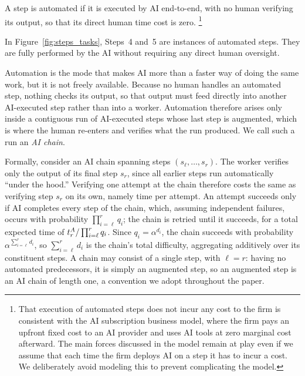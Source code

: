 \begin{definition}
\label{def:automated_task}
A step is automated if it is executed by AI end-to-end, with no human verifying its output, so that its direct human time cost is zero.%
\footnote{That execution of automated steps does not incur any cost to the firm is consistent with the AI subscription business model, where the firm pays an upfront fixed cost to an AI provider and uses AI tools at zero marginal cost afterward. The main forces discussed in the model remain at play even if we assume that each time the firm deploys AI on a step it has to incur a cost. We deliberately avoid modeling this to prevent complicating the model.}
\end{definition}
In Figure~\ref{fig:steps_tasks}, Steps~4 and~5 are instances of automated steps. They are fully performed by the AI without requiring any direct human oversight.

Automation is the mode that makes AI more than a faster way of doing the same work, but it is not freely available.
Because no human handles an automated step, nothing checks its output, so that output must feed directly into another AI-executed step rather than into a worker.
Automation therefore arises only inside a contiguous run of AI-executed steps whose last step is augmented, which is where the human re-enters and verifies what the run produced.
We call such a run an \emph{AI chain}.

Formally, consider an AI chain spanning steps $(s_\ell, \dotsc, s_r)$.
The worker verifies only the output of its final step $s_r$, since all earlier steps run automatically ``under the hood.''
Verifying one attempt at the chain therefore costs the same as verifying step $s_r$ on its own, namely time  per attempt.
An attempt succeeds only if AI completes every step of the chain, which, assuming independent failures, occurs with probability $\prod_{i=\ell}^{r} q_i$; the chain is retried until it succeeds, for a total expected time of $t^{A}_{r}/\prod_{i=\ell}^{r} q_i$.
Since $q_i = \alpha^{d_i}$, the chain succeeds with probability $\alpha^{\sum_{i=\ell}^{r} d_i}$, so $\sum_{i=\ell}^{r} d_i$ is the chain's total difficulty, aggregating additively over its constituent steps.
A chain may consist of a single step, with $\ell = r$: having no automated predecessors, it is simply an augmented step, so an augmented step is an AI chain of length one, a convention we adopt throughout the paper.

